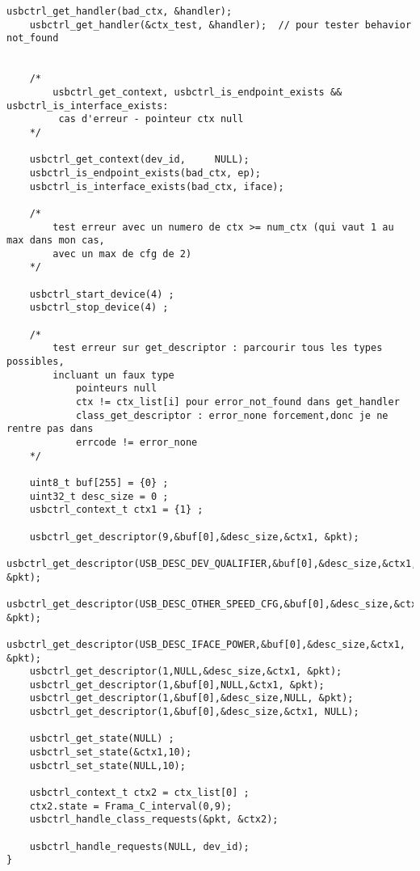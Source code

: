 \begin{lstlisting}[style=CStyle]
    usbctrl_get_handler(bad_ctx, &handler);
    usbctrl_get_handler(&ctx_test, &handler);  // pour tester behavior not_found


    /*
        usbctrl_get_context, usbctrl_is_endpoint_exists &&  usbctrl_is_interface_exists:
         cas d'erreur - pointeur ctx null
    */

    usbctrl_get_context(dev_id,     NULL);
    usbctrl_is_endpoint_exists(bad_ctx, ep);
    usbctrl_is_interface_exists(bad_ctx, iface);

    /*
        test erreur avec un numero de ctx >= num_ctx (qui vaut 1 au max dans mon cas,
        avec un max de cfg de 2)
    */

    usbctrl_start_device(4) ;
    usbctrl_stop_device(4) ;

    /*
        test erreur sur get_descriptor : parcourir tous les types possibles,
        incluant un faux type
            pointeurs null
            ctx != ctx_list[i] pour error_not_found dans get_handler
            class_get_descriptor : error_none forcement,donc je ne rentre pas dans
            errcode != error_none
    */

    uint8_t buf[255] = {0} ;
    uint32_t desc_size = 0 ;
    usbctrl_context_t ctx1 = {1} ;

    usbctrl_get_descriptor(9,&buf[0],&desc_size,&ctx1, &pkt);
    usbctrl_get_descriptor(USB_DESC_DEV_QUALIFIER,&buf[0],&desc_size,&ctx1, &pkt);
    usbctrl_get_descriptor(USB_DESC_OTHER_SPEED_CFG,&buf[0],&desc_size,&ctx1, &pkt);
    usbctrl_get_descriptor(USB_DESC_IFACE_POWER,&buf[0],&desc_size,&ctx1, &pkt);
    usbctrl_get_descriptor(1,NULL,&desc_size,&ctx1, &pkt);
    usbctrl_get_descriptor(1,&buf[0],NULL,&ctx1, &pkt);
    usbctrl_get_descriptor(1,&buf[0],&desc_size,NULL, &pkt);
    usbctrl_get_descriptor(1,&buf[0],&desc_size,&ctx1, NULL);

    usbctrl_get_state(NULL) ;
    usbctrl_set_state(&ctx1,10);
    usbctrl_set_state(NULL,10);

	usbctrl_context_t ctx2 = ctx_list[0] ;
	ctx2.state = Frama_C_interval(0,9);
	usbctrl_handle_class_requests(&pkt, &ctx2);

	usbctrl_handle_requests(NULL, dev_id);
}
\end{lstlisting}

